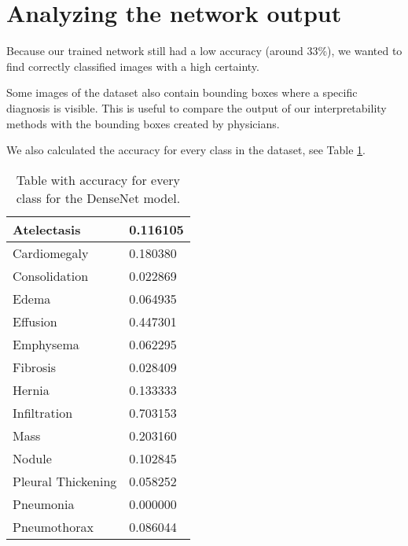 \section{Analyzing the network output}
Because our trained network still had a low accuracy (around 33\%), we wanted to find correctly classified images with a high certainty.

Some images of the dataset also contain bounding boxes where a specific diagnosis is visible. This is useful to compare the output
of our interpretability methods with the bounding boxes created by physicians.


We also calculated the accuracy for every class in the dataset, see Table \ref{chestxrayaccuracy}.

\begin{table}[H]
\begin{center}
\begin{tabular}{ | l | l | }
\hline
Atelectasis & 0.116105 \\ \hline
Cardiomegaly & 0.180380 \\ \hline
Consolidation & 0.022869 \\ \hline
Edema & 0.064935 \\ \hline
Effusion & 0.447301 \\ \hline
Emphysema & 0.062295 \\ \hline
Fibrosis & 0.028409 \\ \hline
Hernia & 0.133333 \\ \hline
Infiltration & 0.703153 \\ \hline
Mass & 0.203160 \\ \hline
Nodule & 0.102845 \\ \hline
Pleural Thickening & 0.058252 \\ \hline
Pneumonia & 0.000000 \\ \hline
Pneumothorax & 0.086044 \\
\hline
\end{tabular}
\caption{Table with accuracy for every class for the DenseNet model.}
\label{chestxrayaccuracy}
\end{center}
\end {table}
